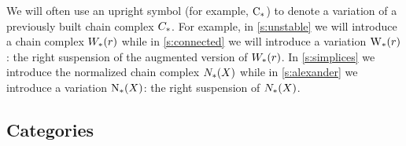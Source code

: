 \begin{notation}
	We will often use an upright symbol (for example, $\operatorname{C}_{*}$) to denote a variation of a previously built chain complex $C_{*}$. For example, in \cref{s:unstable} we will introduce a chain complex $W_{*}(r)$ while in \cref{s:connected} we will introduce a variation $\operatorname{W}_{*}(r)$: the right suspension of the augmented version of $W_{*}(r)$. In \cref{s:simplices} we introduce the normalized chain complex $N_{*}(X)$ while in \cref{s:alexander} we introduce a variation $\operatorname{N}_{*}(X)$: the right suspension of $N_{*}(X)$.
\end{notation}


\subsection{Categories}\label{s:categories}

